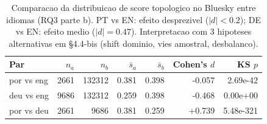 \begin{table}[H]\centering
\caption{Comparacao da distribuicao de score topologico no Bluesky entre idiomas (RQ3 parte b). PT vs EN: efeito desprezivel ($|d|<0.2$); DE vs EN: efeito medio ($|d|=0.47$). Interpretacao com 3 hipoteses alternativas em \S 4.4-bis (shift dominio, vies amostral, desbalanco).}
\label{tab:rq3_multilingual}
\begin{tabular}{lrrrrrr}
\toprule
Par & $n_a$ & $n_b$ & $\bar s_a$ & $\bar s_b$ & Cohen's $d$ & KS $p$ \\
\midrule
por vs eng & 2661 & 132312 & 0.381 & 0.398 & -0.057 & 2.69e-42 \\
deu vs eng & 9686 & 132312 & 0.259 & 0.398 & -0.468 & 0.00e+00 \\
por vs deu & 2661 & 9686 & 0.381 & 0.259 & +0.739 & 5.48e-321 \\
\bottomrule
\end{tabular}
\end{table}
